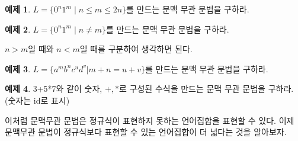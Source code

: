 \documentclass[b5paper]{book}
\theoremstyle{definition}
\newtheorem{ex}{예제}[chapter]
\begin{document}
\begin{ex} $L = \{ 0^n 1^m \; \vert \; n \le m \le 2n\}$를 만드는 문맥 무관 문법을 구하라.
\end{ex}
\begin{ex} 
    $L = \{ 0^n 1^m \; \vert \; n \neq m\}$를 만드는 문맥 무관 문법을 구하라.
\end{ex}
$n>m$일 때와 $n < m$일 때를 구분하여 생각하면 된다.
\begin{ex} $L = \{ a^m b^n c^u d^v \vert m+n = u+v\}$를 만드는 문맥 무관 문법을 구하라.
\end{ex}
\begin{ex} \label{3+5*7}
    3+5*7와 같이 숫자, $+, *$로 구성된 수식을 만드는 문맥 무관 문법을 구하라. (숫자는 id로 표시)
\end{ex}
이처럼 문맥무관 문법은 정규식이 표현하지 못하는 언어집합을 표현할 수 있다.
이제 문맥무관 문법이 정규식보다 표현할 수 있는 언어집합이 더 넓다는 것을 알아보자.
\end{document}
